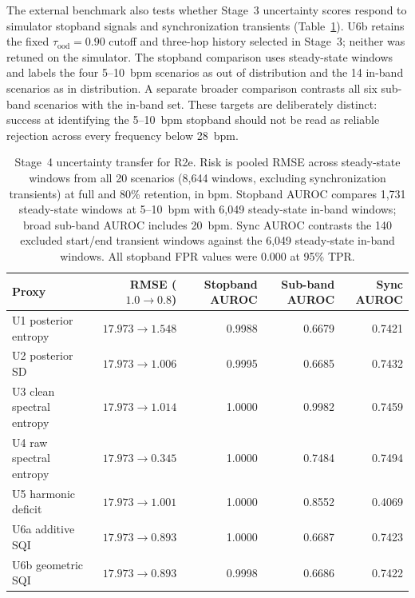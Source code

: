 The external benchmark also tests whether Stage~3 uncertainty scores respond to simulator stopband signals and synchronization transients (Table~\ref{tab:ch6_uncertainty_transfer}). U6b retains the fixed $\tau_{\mathrm{ood}}=0.90$ cutoff and three-hop history selected in Stage~3; neither was retuned on the simulator. The stopband comparison uses steady-state windows and labels the four 5--10~bpm scenarios as out of distribution and the 14 in-band scenarios as in distribution. A separate broader comparison contrasts all six sub-band scenarios with the in-band set. These targets are deliberately distinct: success at identifying the 5--10~bpm stopband should not be read as reliable rejection across every frequency below 28~bpm.

\begin{table}[htbp]
\centering
\footnotesize
\setlength{\tabcolsep}{4pt}
\caption{Stage~4 uncertainty transfer for R2e. Risk is pooled RMSE across steady-state windows from all 20 scenarios (8,644 windows, excluding synchronization transients) at full and 80\% retention, in bpm. Stopband AUROC compares 1,731 steady-state windows at 5--10~bpm with 6,049 steady-state in-band windows; broad sub-band AUROC includes 20~bpm. Sync AUROC contrasts the 140 excluded start/end transient windows against the 6,049 steady-state in-band windows. All stopband FPR values were 0.000 at 95\% TPR.}
\label{tab:ch6_uncertainty_transfer}
\begin{tabularx}{\textwidth}{@{}>{\raggedright\arraybackslash}Xrrrr@{}}
\toprule
Proxy & RMSE ($1.0 \rightarrow 0.8$) & Stopband AUROC & Sub-band AUROC & Sync AUROC \\
\midrule
U1 posterior entropy & $17.973 \rightarrow 1.548$ & 0.9988 & 0.6679 & 0.7421 \\
U2 posterior SD & $17.973 \rightarrow 1.006$ & 0.9995 & 0.6685 & 0.7432 \\
U3 clean spectral entropy & $17.973 \rightarrow 1.014$ & 1.0000 & 0.9982 & 0.7459 \\
U4 raw spectral entropy & $17.973 \rightarrow 0.345$ & 1.0000 & 0.7484 & 0.7494 \\
U5 harmonic deficit & $17.973 \rightarrow 1.001$ & 1.0000 & 0.8552 & 0.4069 \\
U6a additive SQI & $17.973 \rightarrow 0.893$ & 1.0000 & 0.6687 & 0.7423 \\
U6b geometric SQI & $17.973 \rightarrow 0.893$ & 0.9998 & 0.6686 & 0.7422 \\
\bottomrule
\end{tabularx}
\end{table}

